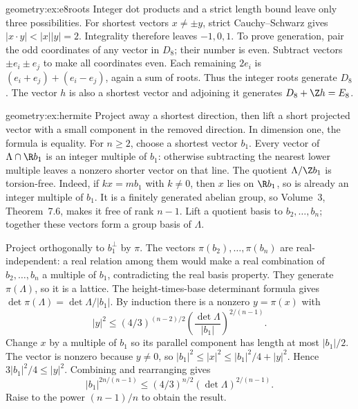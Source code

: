 \begin{solution}{geometry:ex:e8roots}
\idea Integer dot products and a strict length bound leave only three
possibilities.
\writeup For shortest vectors $x\ne\pm y$, strict Cauchy--Schwarz gives
$|x\cdot y|<|x||y|=2$. Integrality therefore leaves $-1,0,1$.
To prove generation, pair the odd coordinates of any vector in $D_8$;
their number is even. Subtract vectors $\pm e_i\pm e_j$ to make all
coordinates even. Each remaining $2e_i$ is
$(e_i+e_j)+(e_i-e_j)$, again a sum of roots.
Thus the integer roots generate $D_8$. The vector $h$ is also a shortest
vector and adjoining it generates $D_8+\Z h=E_8$.
\end{solution}
\begin{solution}{geometry:ex:hermite}
\idea Project away a shortest direction, then lift a short projected vector
with a small component in the removed direction.
\writeup In dimension one, the formula is equality.
For $n\ge2$, choose a shortest vector $b_1$.
Every vector of $\Lambda\cap\R b_1$ is an integer multiple of $b_1$:
otherwise subtracting the nearest lower multiple leaves a nonzero
shorter vector on that line. The quotient $\Lambda/\Z b_1$ is
torsion-free. Indeed, if $kx=mb_1$ with $k\ne0$, then $x$ lies on
$\R b_1$, so is already an integer multiple of $b_1$.
It is a finitely generated abelian group, so Volume~3, Theorem~7.6,
makes it free of rank $n-1$. Lift a quotient basis to $b_2,\ldots,b_n$;
together these vectors form a group basis of $\Lambda$.

Project orthogonally to $b_1^\perp$ by $\pi$.
The vectors $\pi(b_2),\ldots,\pi(b_n)$ are real-independent:
a real relation among them would make a real combination of
$b_2,\ldots,b_n$ a multiple of $b_1$, contradicting the real basis
property. They generate $\pi(\Lambda)$, so it is a lattice.
The height-times-base determinant formula gives
$\det\pi(\Lambda)=\det\Lambda/|b_1|$.
By induction there is a nonzero $y=\pi(x)$ with
\[
 |y|^2\le(4/3)^{(n-2)/2}
 \left(\frac{\det\Lambda}{|b_1|}\right)^{2/(n-1)}.
\]
Change $x$ by a multiple of $b_1$ so its parallel component has length
at most $|b_1|/2$. The vector is nonzero because $y\ne0$, so
$|b_1|^2\le|x|^2\le|b_1|^2/4+|y|^2$.
Hence $3|b_1|^2/4\le|y|^2$. Combining and rearranging gives
\[
 |b_1|^{2n/(n-1)}\le(4/3)^{n/2}(\det\Lambda)^{2/(n-1)}.
\]
Raise to the power $(n-1)/n$ to obtain the result.
\end{solution}

